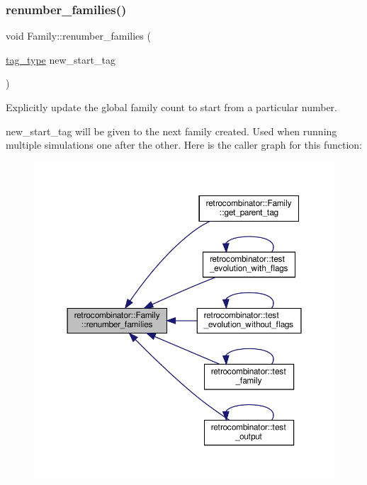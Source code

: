 \subsubsection{\texorpdfstring{renumber\+\_\+families()}{renumber\_families()}}
{\footnotesize\ttfamily void Family\+::renumber\+\_\+families (\begin{DoxyParamCaption}\item[{\hyperlink{constants_8h_afd7c6eb4293e8c4d12827609a9a34b9b}{tag\+\_\+type}}]{new\+\_\+start\+\_\+tag }\end{DoxyParamCaption})\hspace{0.3cm}{\ttfamily [static]}}



Explicitly update the global family count to start from a particular number. 

new\+\_\+start\+\_\+tag will be given to the next family created. Used when running multiple simulations one after the other. Here is the caller graph for this function\+:
\nopagebreak
\begin{figure}[H]
\begin{center}
\leavevmode
\includegraphics[width=350pt]{classretrocombinator_1_1Family_a79b180c88225ee52d21da020375d2dfd_icgraph}
\end{center}
\end{figure}
\mbox{\label{classretrocombinator_1_1Family_a721e453eb40fa49bd38ae24df001f9a3}} 

